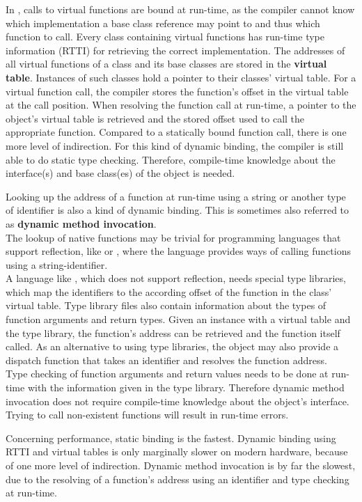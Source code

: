 In , calls to virtual functions are bound at run-time, as the compiler cannot know which implementation a base class reference may point to and thus which function to call. Every class containing virtual functions has run-time type information (RTTI) for retrieving the correct implementation. The addresses of all virtual functions of a class and its base classes are stored in the \textbf{virtual table}. Instances of such classes hold a pointer to their classes' virtual table. For a virtual function call, the compiler stores the function's offset in the virtual table at the call position. When resolving the function call at run-time, a pointer to the object's virtual table is retrieved and the stored offset used to call the appropriate function. Compared to a statically bound function call, there is one more level of indirection. For this kind of dynamic binding, the compiler is still able to do static type checking. Therefore, compile-time knowledge about the interface(s) and base class(es) of the object is needed. 

Looking up the address of a function at run-time using a string or another type of identifier is also a kind of dynamic binding. This is sometimes also referred to as \textbf{dynamic method invocation}.\\
The lookup of native functions may be trivial for programming languages that support reflection, like  or , where the language provides ways of calling functions using a string-identifier.\\
A language like , which does not support reflection, needs special type libraries, which map the identifiers to the according offset of the function in the class' virtual table. Type library files also contain information about the types of function arguments and return types. Given an instance with a virtual table and the type library, the function's address can be retrieved and the function itself called. As an alternative to using type libraries, the object may also provide a dispatch function that takes an identifier and resolves the function address.
\\Type checking of function arguments and return values needs to be done at run-time with the information given in the type library. Therefore dynamic method invocation does not require compile-time knowledge about the object's interface. Trying to call non-existent functions will result in run-time errors.

Concerning performance, static binding is the fastest. Dynamic binding using RTTI and virtual tables is only marginally slower on modern hardware, because of one more level of indirection. Dynamic method invocation is by far the slowest, due to the resolving of a function's address using an identifier and type checking at run-time. 

